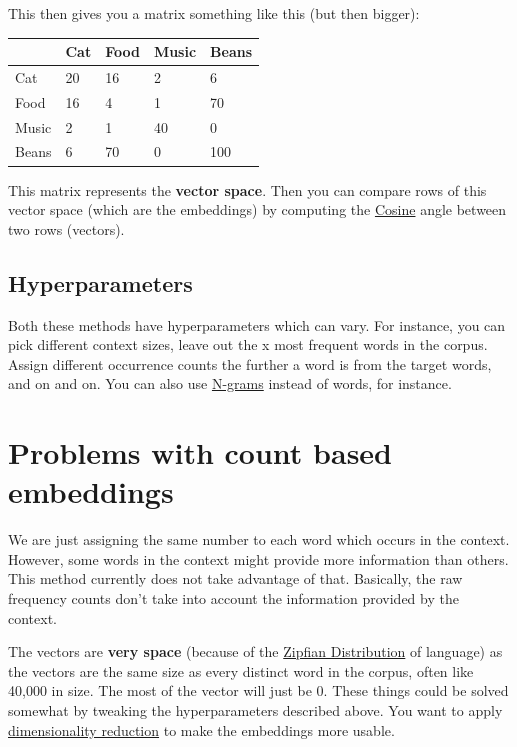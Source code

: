 \documentclass[
  11pt,
  british,
]{article}
\begin{document}
This then gives you a matrix something like this (but then bigger):

\begin{longtable}[]{@{}lllll@{}}
\toprule
& Cat & Food & Music & Beans \\
\midrule
\endhead
Cat & 20 & 16 & 2 & 6 \\
Food & 16 & 4 & 1 & 70 \\
Music & 2 & 1 & 40 & 0 \\
Beans & 6 & 70 & 0 & 100 \\
\bottomrule
\end{longtable}

This matrix represents the \textbf{vector space}. Then you can compare
rows of this vector space (which are the embeddings) by computing the
\href{Cosine.md}{Cosine} angle between two rows (vectors).

\hypertarget{hyperparameters}{%
\subsection{Hyperparameters}\label{hyperparameters}}

Both these methods have hyperparameters which can vary. For instance,
you can pick different context sizes, leave out the x most frequent
words in the corpus. Assign different occurrence counts the further a
word is from the target words, and on and on. You can also use
\href{../Languages/N-grams.md}{N-grams} instead of words, for instance.

\hypertarget{problems-with-count-based-embeddings}{%
\section{Problems with count based
embeddings}\label{problems-with-count-based-embeddings}}

We are just assigning the same number to each word which occurs in the
context. However, some words in the context might provide more
information than others. This method currently does not take advantage
of that. Basically, the raw frequency counts don't take into account the
information provided by the context.

The vectors are \textbf{very space} (because of the
\href{../Languages/Zipfian\%20Distribution.md}{Zipfian Distribution} of
language) as the vectors are the same size as every distinct word in the
corpus, often like 40,000 in size. The most of the vector will just be
0. These things could be solved somewhat by tweaking the hyperparameters
described above. You want to apply
\href{Dimensionality\%20reduction.md}{dimensionality reduction} to make
the embeddings more usable.
\end{document}
